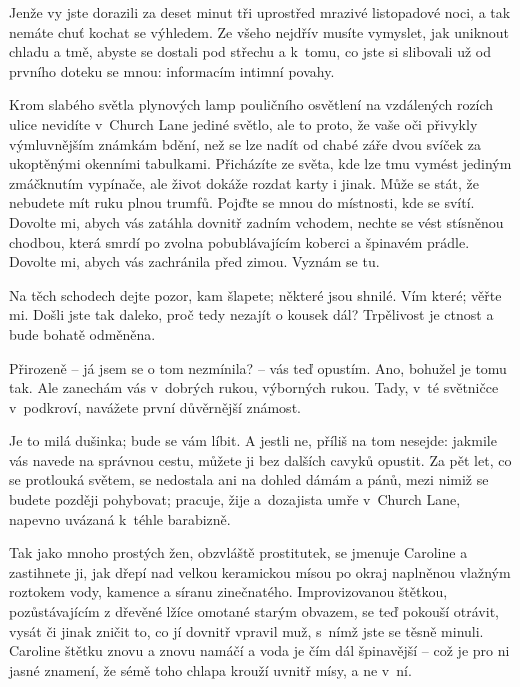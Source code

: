 Jenže vy jste dorazili za deset minut tři uprostřed mrazivé listopadové noci, a tak nemáte chuť kochat se výhledem. Ze všeho nejdřív musíte vymyslet, jak uniknout chladu a tmě, abyste se dostali pod střechu a k tomu, co jste si slibovali už od prvního doteku se mnou: informacím intimní povahy.

Krom slabého světla plynových lamp pouličního osvětlení na vzdálených rozích ulice nevidíte v Church Lane jediné světlo, ale to proto, že vaše oči přivykly výmluvnějším známkám bdění, než se lze nadít od chabé záře dvou svíček za ukoptěnými okenními tabulkami. Přicházíte ze světa, kde lze tmu vymést jediným zmáčknutím vypínače, ale život dokáže rozdat karty i jinak. Může se stát, že nebudete mít ruku plnou trumfů.
Pojďte se mnou do místnosti, kde se svítí. Dovolte mi, abych vás zatáhla dovnitř zadním vchodem, nechte se vést stísněnou chodbou, která smrdí po zvolna pobublávajícím koberci a špinavém prádle. Dovolte mi, abych vás zachránila před zimou. Vyznám se tu.

Na těch schodech dejte pozor, kam šlapete; některé jsou shnilé. Vím které; věřte mi. Došli jste tak daleko, proč tedy nezajít o kousek dál?
 Trpělivost je ctnost a bude bohatě odměněna.

Přirozeně -- já jsem se o tom nezmínila? -- vás teď opustím. Ano, bohužel je tomu tak. Ale zanechám vás v dobrých rukou, výborných rukou. Tady, v té světničce v podkroví, navážete první důvěrnější známost.

Je to milá dušinka; bude se vám líbit. A jestli ne, příliš na tom nesejde: jakmile vás navede na správnou cestu, můžete ji bez dalších cavyků opustit. Za pět let, co se protlouká světem, se nedostala ani na dohled dámám a pánů, mezi nimiž se budete později pohybovat; pracuje, žije a dozajista umře v Church Lane, napevno uvázaná k téhle barabizně.

Tak jako mnoho prostých žen, obzvláště prostitutek, se jmenuje Caroline a zastihnete ji, jak dřepí nad velkou keramickou mísou po okraj naplněnou vlažným roztokem vody, kamence a síranu zinečnatého. Improvizovanou štětkou, pozůstávajícím z dřevěné lžíce omotané starým obvazem, se teď pokouší otrávit, vysát či jinak zničit to, co jí dovnitř vpravil muž, s nímž jste se těsně minuli. Caroline štětku znovu a znovu namáčí a voda je čím dál špinavější -- což je pro ni jasné znamení, že sémě toho chlapa krouží uvnitř mísy, a ne v ní. 

